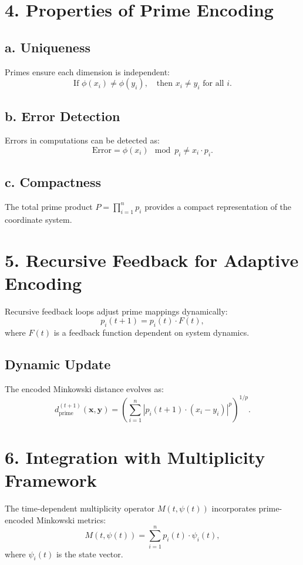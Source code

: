 \documentclass{article}
\theoremstyle{plain}
\begin{document}
\section*{4. Properties of Prime Encoding}
\subsection*{a. Uniqueness}
Primes ensure each dimension is independent:
\begin{equation}
\text{If } \phi(x_i) \neq \phi(y_i), \quad \text{then } x_i \neq y_i \text{ for all } i.
\end{equation}

\subsection*{b. Error Detection}
Errors in computations can be detected as:
\begin{equation}
\text{Error} = \phi(x_i) \mod p_i \neq x_i \cdot p_i.
\end{equation}

\subsection*{c. Compactness}
The total prime product \( P = \prod_{i=1}^n p_i \) provides a compact representation of the coordinate system.

\section*{5. Recursive Feedback for Adaptive Encoding}
Recursive feedback loops adjust prime mappings dynamically:
\begin{equation}
p_i(t+1) = p_i(t) \cdot F(t),
\end{equation}
where \( F(t) \) is a feedback function dependent on system dynamics.

\subsection*{Dynamic Update}
The encoded Minkowski distance evolves as:
\begin{equation}
d_{\text{prime}}^{(t+1)}(\mathbf{x}, \mathbf{y}) = \left( \sum_{i=1}^n |p_i(t+1) \cdot (x_i - y_i)|^p \right)^{1/p}.
\end{equation}

\section*{6. Integration with Multiplicity Framework}
The time-dependent multiplicity operator \( M(t, \psi(t)) \) incorporates prime-encoded Minkowski metrics:
\begin{equation}
M(t, \psi(t)) = \sum_{i=1}^n p_i(t) \cdot \psi_i(t),
\end{equation}
where \( \psi_i(t) \) is the state vector.
\end{document}
